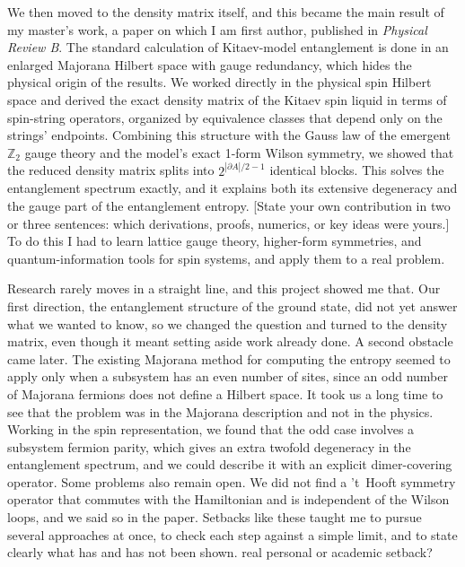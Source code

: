 We then moved to the density matrix itself, and this became the main result of my master's work, a paper on which I am first author, published in \textit{Physical Review B}. The standard calculation of Kitaev-model entanglement is done in an enlarged Majorana Hilbert space with gauge redundancy, which hides the physical origin of the results. We worked directly in the physical spin Hilbert space and derived the exact density matrix of the Kitaev spin liquid in terms of spin-string operators, organized by equivalence classes that depend only on the strings' endpoints. Combining this structure with the Gauss law of the emergent $\mathbb{Z}_2$ gauge theory and the model's exact 1-form Wilson symmetry, we showed that the reduced density matrix splits into $2^{|\partial A|/2-1}$ identical blocks. This solves the entanglement spectrum exactly, and it explains both its extensive degeneracy and the gauge part of the entanglement entropy. [State your own contribution in two or three sentences: which derivations, proofs, numerics, or key ideas were yours.] To do this I had to learn lattice gauge theory, higher-form symmetries, and quantum-information tools for spin systems, and apply them to a real problem.

Research rarely moves in a straight line, and this project showed me that. Our first direction, the entanglement structure of the ground state, did not yet answer what we wanted to know, so we changed the question and turned to the density matrix, even though it meant setting aside work already done. A second obstacle came later. The existing Majorana method for computing the entropy seemed to apply only when a subsystem has an even number of sites, since an odd number of Majorana fermions does not define a Hilbert space. It took us a long time to see that the problem was in the Majorana description and not in the physics. Working in the spin representation, we found that the odd case involves a subsystem fermion parity, which gives an extra twofold degeneracy in the entanglement spectrum, and we could describe it with an explicit dimer-covering operator. Some problems also remain open. We did not find a 't~Hooft symmetry operator that commutes with the Hamiltonian and is independent of the Wilson loops, and we said so in the paper. Setbacks like these taught me to pursue several approaches at once, to check each step against a simple limit, and to state clearly what has and has not been shown. {\color{red} real personal or academic setback?}

